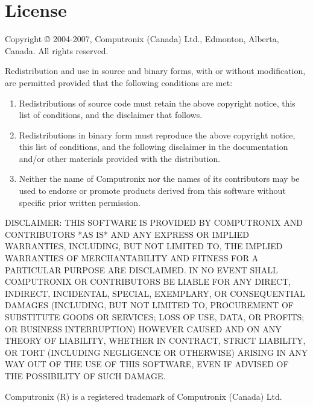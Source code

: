 \chapter{License}

\centerline{}

Copyright \copyright{} 2004-2007, Computronix (Canada) Ltd., Edmonton, Alberta, Canada.
All rights reserved.

Redistribution and use in source and binary forms, with or without
modification, are permitted provided that the following conditions are met:

\begin{enumerate}
\item
    Redistributions of source code must retain the above copyright notice,
    this list of conditions, and the disclaimer that follows.

\item
    Redistributions in binary form must reproduce the above copyright
    notice, this list of conditions, and the following disclaimer in the
    documentation and/or other materials provided with the distribution.

\item
    Neither the name of Computronix nor the names of its contributors may
    be used to endorse or promote products derived from this software
    without specific prior written permission.
\end{enumerate}

DISCLAIMER:
THIS SOFTWARE IS PROVIDED BY COMPUTRONIX AND CONTRIBUTORS *AS IS*
AND ANY EXPRESS OR IMPLIED WARRANTIES, INCLUDING, BUT NOT LIMITED TO,
THE IMPLIED WARRANTIES OF MERCHANTABILITY AND FITNESS FOR A
PARTICULAR PURPOSE ARE DISCLAIMED. IN NO EVENT SHALL COMPUTRONIX
OR CONTRIBUTORS BE LIABLE FOR ANY DIRECT, INDIRECT, INCIDENTAL,
SPECIAL, EXEMPLARY, OR CONSEQUENTIAL DAMAGES (INCLUDING, BUT NOT
LIMITED TO, PROCUREMENT OF SUBSTITUTE GOODS OR SERVICES; LOSS OF
USE, DATA, OR PROFITS; OR BUSINESS INTERRUPTION) HOWEVER CAUSED
AND ON ANY THEORY OF LIABILITY, WHETHER IN CONTRACT, STRICT LIABILITY,
OR TORT (INCLUDING NEGLIGENCE OR OTHERWISE) ARISING IN ANY WAY OUT
OF THE USE OF THIS SOFTWARE, EVEN IF ADVISED OF THE POSSIBILITY OF
SUCH DAMAGE.

Computronix (R) is a registered trademark of Computronix (Canada) Ltd.

